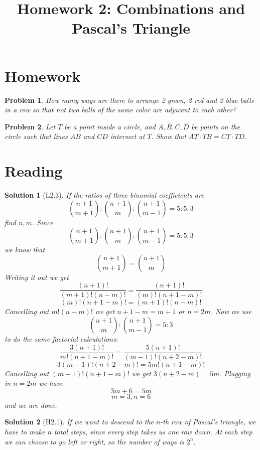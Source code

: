 \documentclass[a4paper,12pt]{article}
\title{Homework 2: Combinations and Pascal's Triangle}
\theoremstyle{perfect}
\newtheorem{prb}{Problem}
\newtheorem{sol}{Solution}
\begin{document}
 
\maketitle

\section{Homework}

\begin{prb}
How many ways are there to arrange 2 green, 2 red and 2 blue balls in a row so that not two balls of the same color are adjacent to each other?
\end{prb}

\begin{prb}
Let $T$ be a point inside a circle, and $A, B, C, D$ be points on the circle such that lines $AB$ and $CD$ intersect at $T$. Show that $AT\cdot TB = CT \cdot TD$.
\end{prb}

\section{Reading}

\begin{sol}[L2.3]
\textit{If the ratios of three binomial coefficients are} $${{n+1} \choose {m+1}} : {{n+1} \choose {m}} : {{n+1} \choose {m-1}} = 5 : 5 : 3$$ \textit{find $n,m$}.
Since $${{n+1} \choose {m+1}} : {{n+1} \choose {m}} : {{n+1} \choose {m-1}} = 5 : 5 : 3$$ we know that $${{n+1} \choose {m+1}} = {{n+1} \choose {m}}$$
Writing it out we get 
$$\frac{(n+1)!}{(m+1)!(n-m)!} = \frac{(n+1)!}{(m)!(n+1-m)!}$$
$$(m)!(n+1-m)! = (m+1)!(n-m)!$$
Cancelling out $m!(n-m)!$ we get $n+1-m = m+1$ or $n = 2m$.
Now we use 
$${{n+1} \choose {m}} : {{n+1} \choose {m-1}} = 5 : 3$$ 
to do the same factorial calculations:
$$\frac{3(n+1)!}{m!(n+1-m)!} = \frac{5(n+1)!}{(m-1)!(n+2-m)!}$$
$$3(m-1)!(n+2-m)! = 5m!(n+1-m)!$$
Cancelling out $(m-1)!(n+1-m)!$ we get $3(n+2-m) = 5m$. Plugging in $n= 2m$ we have $$3m + 6 = 5m$$
$$m = 3, n = 6$$
and we are done.
\end{sol}

\begin{sol}[H2.1]
If we want to descend to the $n$-th row of Pascal's triangle, we have to make $n$ total steps, since every step takes us one row down. At each step we can choose to go left or right, so the number of ways is $2^n$.
\end{sol}
\end{document}
